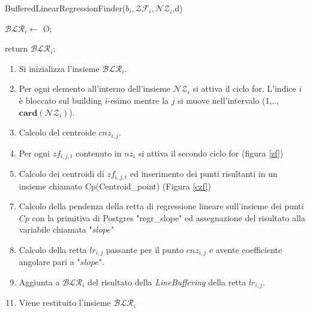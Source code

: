 	
\newpage
	

\begin{algorithm}[H]
	
	\IncMargin{1em}
	\caption{BufferedLinearRegressionFinder($b_i , \mathcal{ZF}_i , \mathcal{NZ}_i$,d)}
	\label{alg:four}
	\BlankLine
	\SetAlgoNoLine
	$\mathcal{BLR}_i \leftarrow$ \O ;\\
	
	return $\mathcal{BLR}_i;$
	
\end{algorithm}

\begin{enumerate}
	\item Si inizializza l'insieme $\mathcal{BLR}_i$.
	\item Per ogni elemento all'interno dell'insieme $\mathcal{NZ}_i$ si attiva il ciclo for. L'indice $i$ è bloccato sul building $i$-esimo mentre la $j$ si muove nell'intervalo (1,..,$\mathbf{card}(\mathcal{NZ}_i)$).
	\item Calcolo del centroide $cnz_{i,j}$.
	\item Per ogni $zf_{i,j,t}$ contenuto in $nz_i$ si attiva il secondo ciclo for (figura \ref{zf}) 
	\item Calcolo dei centroidi di $zf_{i,j,t}$ ed inserimento dei punti risultanti in un insieme chiamato Cp(Centroid\_point) (Figura \ref{czf})
\end{enumerate}
\begin{enumerate}
	\setcounter{enumi}{6}
	\item Calcolo della pendenza della retta di regressione lineare sull'insieme dei punti $Cp$ con la primitiva di Postgres "regr\_slope" ed assegnazione del risultato alla variabile chiamata "$slope$"
	\item Calcolo della retta $lr_{i,j}$ passante per il punto $cnz_{i,j}$ e avente coefficiente angolare pari a "$slope$".
	\item Aggiunta a $\mathcal{BLR}_i$ del risultato della \textit{LineBuffering} della retta $lr_{i,j}$.
\end{enumerate}
\begin{enumerate}
	\setcounter{enumi}{10}
	\item Viene restituito l'insieme $\mathcal{BLR}_i$
\end{enumerate}


